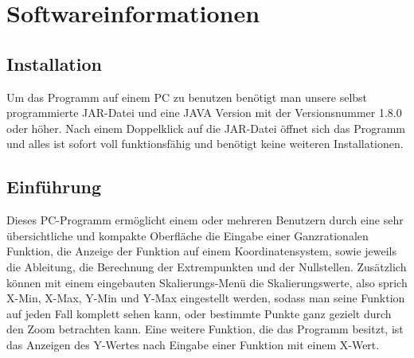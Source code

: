 
\ihead{\headmark}
\cfoot{\pagemark}


\section{Softwareinformationen}

\subsection{Installation}
Um das Programm auf einem PC zu benutzen benötigt man unsere selbst programmierte JAR-Datei und eine JAVA Version mit der Versionsnummer 1.8.0 oder höher. Nach einem Doppelklick auf die JAR-Datei öffnet sich das Programm und alles ist sofort voll funktionsfähig und benötigt keine weiteren Installationen. 



\subsection{Einführung}
Dieses PC-Programm ermöglicht einem oder mehreren Benutzern durch eine sehr übersichtliche und kompakte Oberfläche die Eingabe einer Ganzrationalen Funktion, die Anzeige der Funktion auf einem Koordinatensystem, sowie jeweils die Ableitung, die Berechnung der Extrempunkten und der Nullstellen. 
\newline
Zusätzlich können mit einem eingebauten Skalierungs-Menü die Skalierungswerte, also sprich X-Min, X-Max, Y-Min und Y-Max eingestellt werden, sodass man seine Funktion auf jeden Fall komplett sehen kann, oder bestimmte Punkte ganz gezielt durch den Zoom betrachten kann.
Eine weitere Funktion, die das Programm besitzt, ist das Anzeigen des Y-Wertes nach Eingabe einer Funktion mit einem X-Wert.



\newpage